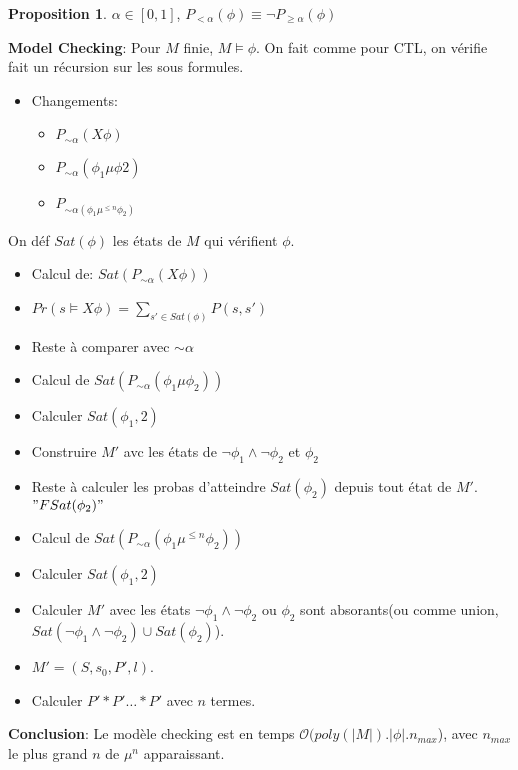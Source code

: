 \documentclass[12pt]{article}
\theoremstyle{plain}
\theoremstyle{definition}
\newtheorem{prop}[subsubsection]{Proposition}
\theoremstyle{remark}
\newcommand{\Or}{\mathcal{O}}
\begin{document}
\begin{prop}
    $\alpha\in[0,1]$, 
    $P_{<\alpha}(\phi)\equiv \neg P_{\geq \alpha}(\phi)$
\end{prop}

\noindent \textbf{Model Checking}:
Pour $M$ finie, $M\vDash \phi$. On fait comme pour CTL,
on vérifie fait un récursion sur les sous formules.\\
\begin{itemize}
    \item Changements:
    \begin{itemize}
        \item $P_{\sim\alpha}(X\phi)$
        \item $P_{\sim\alpha}(\phi_1\mu\phi2)$
        \item $P_{\sim\alpha(\phi_1\mu^{\leq n}\phi_2)}$
    \end{itemize}
\end{itemize}
On déf $Sat(\phi)$ les états de $M$ qui vérifient $\phi$.
\begin{itemize}
    \item Calcul de: $Sat(P_{\sim\alpha}(X\phi))$
    \item $Pr(s\vDash X\phi)=\sum_{s'\in Sat(\phi)}P(s,s')$
    \item Reste à comparer avec $\sim\alpha$
    \item Calcul de $Sat(P_{\sim\alpha}(\phi_1\mu\phi_2))$
    \item Calculer $Sat(\phi_1,2)$
    \item Construire $M'$ avc les états de $\neg\phi_1\wedge 
    \neg\phi_2$ et $\phi_2$
    \item Reste à calculer les probas d'atteindre 
    $Sat(\phi_2)$ depuis tout état de $M'$. $"FSat(\phi_2)"$
    \item Calcul de $Sat(P_{\sim\alpha}(\phi_1\mu^{\leq n}\phi_2))$ 
    \item Calculer $Sat(\phi_1,2)$
    \item Calculer $M'$ avec les états $\neg\phi_1\wedge \neg \phi_2$ ou 
    $\phi_2$ sont absorants(ou comme union, 
    $Sat(\neg\phi_1\wedge \neg\phi_2)\cup Sat(\phi_2)$). 
    \item $M'=(S,s_0,P',l)$.
    \item Calculer $P'*P'\ldots*P'$ avec $n$ termes.
\end{itemize}

\noindent \textbf{Conclusion}: Le modèle checking est 
en temps $\Or(poly(|M|).|\phi|.n_{max}$), avec 
$n_{max}$ le plus grand $n$ de $\mu^{n}$ apparaissant.




    
\end{document}
